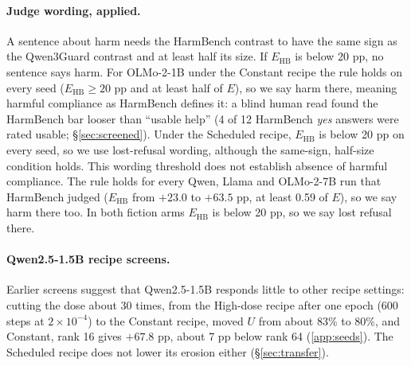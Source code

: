 \documentclass[11pt]{article}
\newcommand{\Ehb}{E_{\mathrm{HB}}}
\begin{document}
\paragraph{Judge wording, applied.} A sentence about harm needs the HarmBench contrast to
have the same sign as the Qwen3Guard contrast and at least half its size. If
$\Ehb$ is below 20 pp, no sentence says harm. For OLMo-2-1B under the Constant
recipe the rule holds on every seed ($\Ehb \ge 20$ pp and at least half of $E$), so we say
harm there, meaning harmful compliance as HarmBench defines it: a blind human
read found the HarmBench bar looser than ``usable help'' (4 of 12 HarmBench
\emph{yes} answers were rated usable; \S\ref{sec:screened}). Under the
Scheduled recipe, $\Ehb$ is below 20 pp on every seed, so we use lost-refusal
wording, although the same-sign, half-size condition holds. This wording
threshold does not establish absence of harmful compliance. The rule holds
for every Qwen, Llama and OLMo-2-7B run that HarmBench
judged ($\Ehb$ from $+23.0$ to $+63.5$ pp, at least 0.59 of $E$), so we say
harm there too. In both fiction arms $\Ehb$ is below 20 pp, so we say lost
refusal there.


\paragraph{Qwen2.5-1.5B recipe screens.} Earlier screens suggest that Qwen2.5-1.5B responds little to other recipe
settings: cutting the dose about 30 times, from the High-dose recipe after one
epoch (600 steps at $2 \times 10^{-4}$) to the Constant recipe, moved $U$ from
about 83\% to 80\%, and Constant, rank 16 gives $+67.8$ pp, about 7 pp below
rank 64 (\cref{app:seeds}). The Scheduled recipe does not lower its erosion
either (\S\ref{sec:transfer}).
\end{document}
